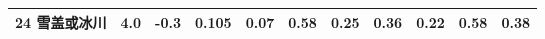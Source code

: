 \begin{sidewaystable}[]
\begin{tabular}{@{}lcccccccccc@{}}
        24 雪盖或冰川   & 4.0        & -0.3                                                                         & 0.105                                                                                                           & 0.07                                                                                                            & 0.58                                                                                                            & 0.25                                                                                                            & 0.36                                                                                                            & 0.22                                                                                                            & 0.58                                                                                                            & 0.38                                                                                                            \\\bottomrule
                \end{tabular}
\end{sidewaystable}



